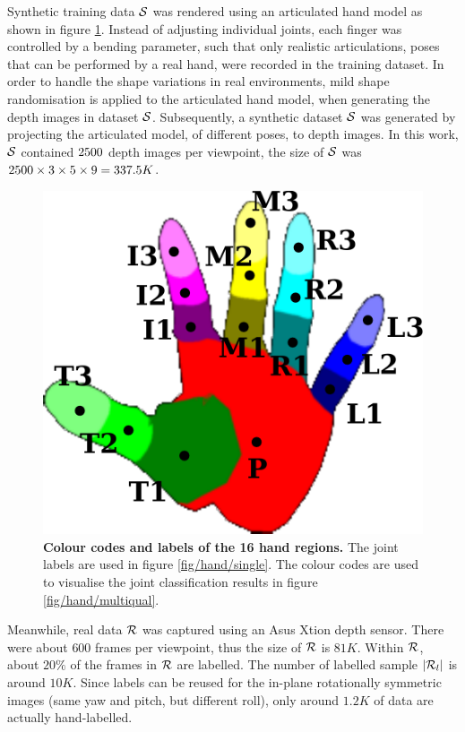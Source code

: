 Synthetic training data $\mathcal{S}$ was rendered using an articulated hand model as shown in figure \ref{fig/hand/label}. 
Instead of adjusting individual joints, each finger was controlled by a bending parameter, such that only realistic articulations, \ie poses that can be performed by a real hand, were recorded in the training dataset. 
In order to handle the shape variations in real environments, mild shape randomisation is applied to the articulated hand model, when generating the depth images in dataset $\mathcal{S}$. 
Subsequently, a synthetic dataset $\mathcal{S}$ was generated by projecting the articulated model, of different poses, to depth images. In this work, $\mathcal{S}$ contained $2500$ depth images per viewpoint, the size of $\mathcal{S}$ was $2500 \times 3 \times 5 \times 9 = 337.5K$.  

\begin{figure}[ht]
	\centering
	\includegraphics[width=0.32\linewidth]{fig/hand/hand.pdf}
	\caption{\textbf{Colour codes and labels of the 16 hand regions.} The joint labels are used in figure \ref{fig/hand/single}. The colour codes are used to visualise the joint classification results in figure \ref{fig/hand/multiqual}.}
	\label{fig/hand/label}
\end{figure}

Meanwhile, real data $\mathcal{R}$ was captured using an Asus Xtion depth sensor. 
There were about $600$ frames per viewpoint, thus the size of $\mathcal{R}$ is $81K$. 
Within $\mathcal{R}$, about $20\%$ of the frames in $\mathcal{R}$ are labelled. 
The number of labelled sample $|\mathcal{R}_{l}|$ is around $10K$.    
Since labels can be reused for the in-plane rotationally symmetric images (same yaw and pitch, but different roll), only around $1.2K$ of data are actually hand-labelled.    

